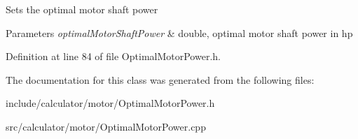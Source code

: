 Sets the optimal motor shaft power 
\begin{DoxyParams}{Parameters}
{\em optimal\+Motor\+Shaft\+Power} & double, optimal motor shaft power in hp \\
\hline
\end{DoxyParams}


Definition at line 84 of file Optimal\+Motor\+Power.\+h.



The documentation for this class was generated from the following files\+:\begin{DoxyCompactItemize}
\item 
include/calculator/motor/Optimal\+Motor\+Power.\+h\item 
src/calculator/motor/Optimal\+Motor\+Power.\+cpp\end{DoxyCompactItemize}
